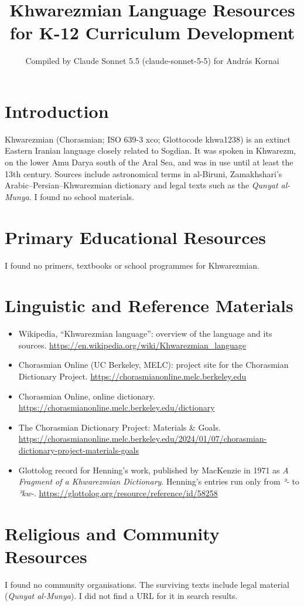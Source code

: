 \documentclass[12pt]{article}
\title{Khwarezmian Language Resources for K-12 Curriculum Development}
\author{Compiled by Claude Sonnet 5.5 (claude-sonnet-5-5) for Andr\'as Kornai}
\date{}
\begin{document}
\maketitle

\section{Introduction}
Khwarezmian (Chorasmian; ISO 639-3 xco; Glottocode khwa1238) is an extinct Eastern Iranian language closely related to Sogdian. It was spoken in Khwarezm, on the lower Amu Darya south of the Aral Sea, and was in use until at least the 13th century. Sources include astronomical terms in al-Biruni, Zamakhshari's Arabic--Persian--Khwarezmian dictionary and legal texts such as the \emph{Qunyat al-Munya}. I found no school materials.

\section{Primary Educational Resources}
I found no primers, textbooks or school programmes for Khwarezmian.

\section{Linguistic and Reference Materials}
\begin{itemize}
\item Wikipedia, ``Khwarezmian language'': overview of the language and its sources. \url{https://en.wikipedia.org/wiki/Khwarezmian_language}
\item Chorasmian Online (UC Berkeley, MELC): project site for the Chorasmian Dictionary Project. \url{https://chorasmianonline.melc.berkeley.edu}
\item Chorasmian Online, online dictionary. \url{https://chorasmianonline.melc.berkeley.edu/dictionary}
\item The Chorasmian Dictionary Project: Materials \& Goals. \url{https://chorasmianonline.melc.berkeley.edu/2024/01/07/chorasmian-dictionary-project-materials-goals}
\item Glottolog record for Henning's work, published by MacKenzie in 1971 as \emph{A Fragment of a Khwarezmian Dictionary}. Henning's entries run only from \textit{ʾ-} to \textit{ʾkw-}. \url{https://glottolog.org/resource/reference/id/58258}
\end{itemize}

\section{Religious and Community Resources}
I found no community organisations. The surviving texts include legal material (\emph{Qunyat al-Munya}). I did not find a URL for it in search results.
\end{document}
